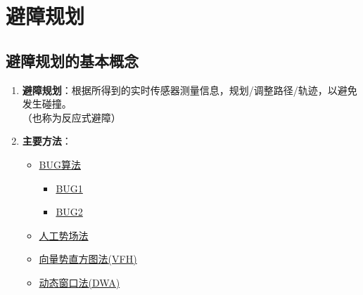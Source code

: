 \documentclass[../main.tex]{subfiles}
\begin{document}
\section{避障规划}

\subsection{避障规划的基本概念}
\begin{enumerate}
    \item \textbf{避障规划}：根据所得到的实时传感器测量信息，规划/调整路径/轨迹，以避免发生碰撞。
    \\{\small\kaishu （也称为反应式避障）}
    \item \textbf{主要方法}：
        \begin{itemize}
            \item \hyperref[bug]{BUG算法}
                \begin{itemize}
                    \item \hyperref[bug1]{BUG1}
                    \item \hyperref[bug2]{BUG2}
                \end{itemize}
            \item \hyperref[shichang]{人工势场法}
            \item \hyperref[xiangliang]{向量势直方图法(VFH)}
            \item \hyperref[dynamicwindow]{动态窗口法(DWA)}
        \end{itemize}
\end{enumerate}
\end{document}
